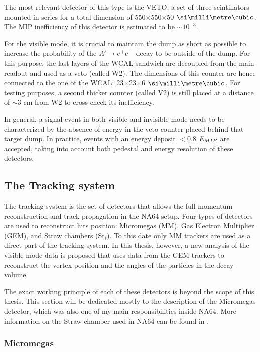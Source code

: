 The most relevant detector of this type is the VETO, a set of three scintillators mounted in series for a total dimension of 550$\times$550$\times$50 $\mmc$. The MIP inefficiency of this detector is estimated to be $\sim 10^{-3}$.

For the visible mode, it is crucial to maintain the dump as short as possible to increase the probability of the $A' \to e^+e^-$ decay to be outside of the dump. For this purpose, the last layers of the WCAL sandwich are decoupled from the main readout and used as a veto (called W2). The dimensions of this counter are hence connected to the one of the WCAL: 23$\times$23$\times$6 $\mmc$. For testing purposes, a second thicker counter (called V2) is still placed at a distance of $\sim3$ \si{cm} from W2 to cross-check its inefficiency.

In general, a signal event in both visible and invisible mode needs to be characterized by the absence of energy in the veto counter placed behind that target dump. In practice, events with an energy deposit $<$0.8 $E_{MIP}$ are accepted, taking into account both pedestal and energy resolution of these detectors.

\subsection{The Tracking system}
\label{ch2:sec:detectors-tracking}

The tracking system is the set of detectors that allows the full momentum reconstruction and track propagation in the NA64 setup. Four types of detectors are used to reconstruct hits position: Micromegas (MM), Gas Electron Multiplier (GEM), and Straw chambers (St$_i$). To this date only MM trackers are used as a direct part of the tracking system. In this thesis, however, a new analysis of the visible mode data is proposed that uses data from the GEM trackers to reconstruct the vertex position and the angles of the particles in the decay volume.

The exact working principle of each of these detectors is beyond the scope of this thesis. This section will be dedicated mostly to the description of the Micromegas detector, which was also one of my main responsibilities inside NA64. More information on the Straw chamber used in NA64 can be found in \cite{pdegen-thesis}.

\subsubsection{Micromegas}

